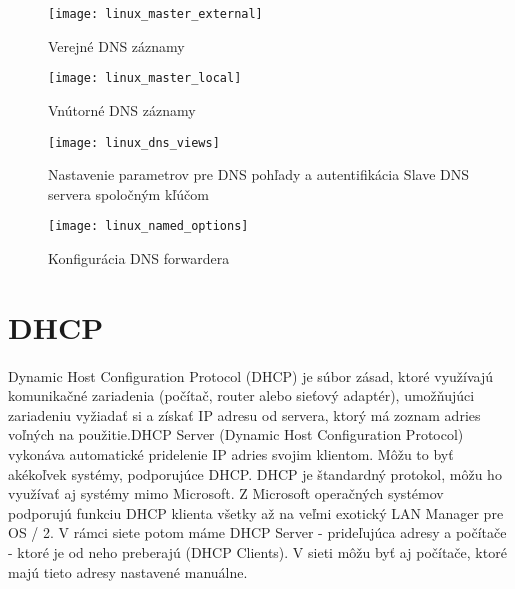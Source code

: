 \begin{figure}[!htb]
\centering
\texttt{[image: linux\_master\_external]}
\caption{Verejné DNS záznamy}
\label{fig:dns_external}
\end{figure}

\begin{figure}[!htb]
\centering
\texttt{[image: linux\_master\_local]}
\caption{Vnútorné DNS záznamy}
\label{fig:dns_internal}
\end{figure}

\begin{figure}[!htb]
\centering
\texttt{[image: linux\_dns\_views]}
\caption{Nastavenie parametrov pre DNS pohľady a autentifikácia Slave DNS servera spoločným kľúčom}
\label{fig:dns_views}
\end{figure}

\begin{figure}[!htb]
\centering
\texttt{[image: linux\_named\_options]}
\caption{Konfigurácia DNS forwardera}
\label{fig:dns_forwarder}
\end{figure}


\section{DHCP}
\paragraph{}
Dynamic Host Configuration Protocol (DHCP) je súbor zásad, ktoré využívajú komunikačné zariadenia (počítač, router alebo sieťový adaptér), umožňujúci zariadeniu vyžiadať si a získať IP adresu od servera, ktorý má zoznam adries voľných na použitie.DHCP Server (Dynamic Host Configuration Protocol) vykonáva automatické pridelenie IP adries svojim klientom. Môžu to byť akékoľvek systémy, podporujúce DHCP. DHCP je štandardný protokol, môžu ho využívať aj systémy mimo Microsoft. Z Microsoft operačných systémov podporujú funkciu DHCP klienta všetky až na veľmi exotický LAN Manager pre OS / 2. V rámci siete potom máme DHCP Server - prideľujúca adresy a počítače - ktoré je od neho preberajú (DHCP Clients). V sieti môžu byť aj počítače, ktoré majú tieto adresy nastavené manuálne.

